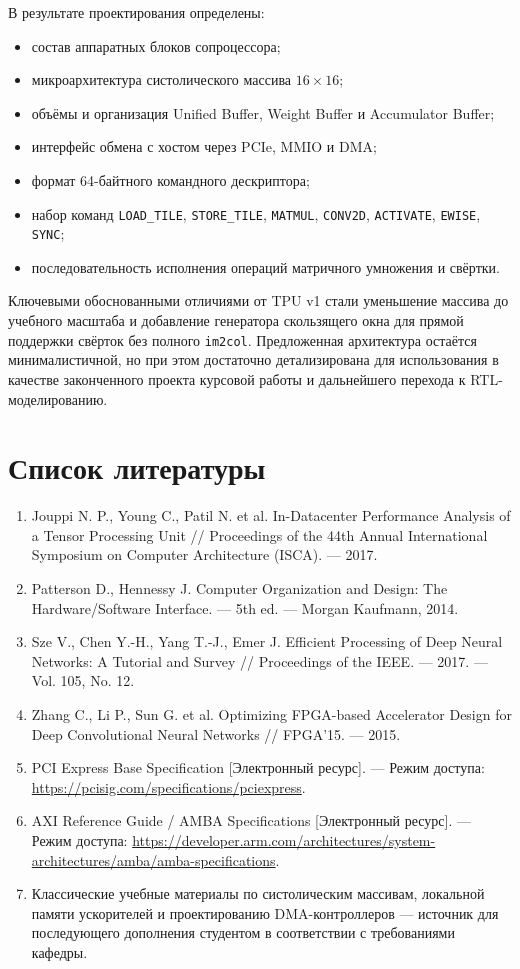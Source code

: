 \documentclass[12pt,a4paper]{article}
\begin{document}
В результате проектирования определены:
\begin{itemize}
    \item состав аппаратных блоков сопроцессора;
    \item микроархитектура систолического массива \(16 \times 16\);
    \item объёмы и организация Unified Buffer, Weight Buffer и Accumulator Buffer;
    \item интерфейс обмена с хостом через PCIe, MMIO и DMA;
    \item формат 64-байтного командного дескриптора;
    \item набор команд \texttt{LOAD\_TILE}, \texttt{STORE\_TILE}, \texttt{MATMUL}, \texttt{CONV2D}, \texttt{ACTIVATE}, \texttt{EWISE}, \texttt{SYNC};
    \item последовательность исполнения операций матричного умножения и свёртки.
\end{itemize}

Ключевыми обоснованными отличиями от TPU v1 стали уменьшение массива до учебного масштаба и добавление генератора скользящего окна для прямой поддержки свёрток без полного \texttt{im2col}. Предложенная архитектура остаётся минималистичной, но при этом достаточно детализирована для использования в качестве законченного проекта курсовой работы и дальнейшего перехода к RTL-моделированию.

\section*{Список литературы}

\begin{enumerate}
    \item Jouppi N. P., Young C., Patil N. et al. In-Datacenter Performance Analysis of a Tensor Processing Unit // Proceedings of the 44th Annual International Symposium on Computer Architecture (ISCA). --- 2017.
    \item Patterson D., Hennessy J. Computer Organization and Design: The Hardware/Software Interface. --- 5th ed. --- Morgan Kaufmann, 2014.
    \item Sze V., Chen Y.-H., Yang T.-J., Emer J. Efficient Processing of Deep Neural Networks: A Tutorial and Survey // Proceedings of the IEEE. --- 2017. --- Vol. 105, No. 12.
    \item Zhang C., Li P., Sun G. et al. Optimizing FPGA-based Accelerator Design for Deep Convolutional Neural Networks // FPGA'15. --- 2015.
    \item PCI Express Base Specification [Электронный ресурс]. --- Режим доступа: \url{https://pcisig.com/specifications/pciexpress}.
    \item AXI Reference Guide / AMBA Specifications [Электронный ресурс]. --- Режим доступа: \url{https://developer.arm.com/architectures/system-architectures/amba/amba-specifications}.
    \item Классические учебные материалы по систолическим массивам, локальной памяти ускорителей и проектированию DMA-контроллеров --- источник для последующего дополнения студентом в соответствии с требованиями кафедры.
\end{enumerate}
\end{document}
